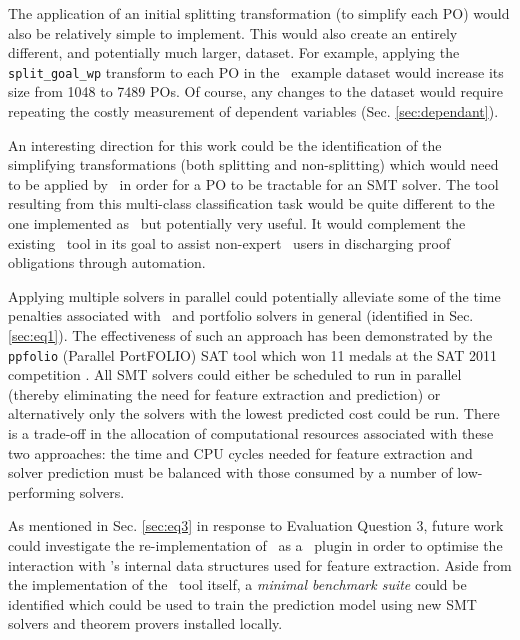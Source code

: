 The application of an initial splitting transformation (to simplify each PO) would also be relatively simple to implement.
This would also create an entirely different, and potentially much larger, dataset. 
For example, applying the \texttt{split\_goal\_wp} transform to each PO in the \why~example dataset would increase its size from 1048 to 7489 POs.
Of course, any changes to the dataset would require repeating the costly measurement of dependent variables (Sec. \ref{sec:dependant}).

An interesting direction for this work could be the identification of the simplifying transformations (both splitting and non-splitting) which would need to be applied by \why~in order for a PO to be tractable for an SMT solver.
The tool resulting from this multi-class classification task would be quite different to the one implemented as \where~but potentially very useful.
It would complement the existing \where~tool in its goal to assist non-expert \why~users in discharging proof obligations through automation.

Applying multiple solvers in parallel could potentially alleviate some of the time penalties associated with \where~and portfolio solvers in general (identified in Sec. \ref{sec:eq1}).
The effectiveness of such an approach has been demonstrated by the \texttt{ppfolio} (Parallel PortFOLIO) SAT tool which won 11 medals at the SAT 2011 competition \cite{Malitsky2012}.
All SMT solvers could either be scheduled to run in parallel (thereby eliminating the need for feature extraction and prediction) or alternatively only the solvers with the lowest predicted cost could be run.
There is a trade-off in the allocation of computational resources associated with these two approaches: the time and CPU cycles needed for feature extraction and solver prediction must be balanced with those consumed by a number of low-performing solvers.     
 
As mentioned in Sec. \ref{sec:eq3} in response to Evaluation Question 3, future work could investigate the re-implementation of \where~as a \why~plugin in order to optimise the interaction with \why's internal data structures used for feature extraction.
Aside from the implementation of the \where~tool itself, a
\textit{minimal benchmark suite} could be identified which could be used to train the prediction model using new SMT solvers and theorem provers installed locally.
